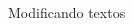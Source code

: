 \begin{frame}{Modificando textos}
\begin{columns}
\begin{column}{0.5\textwidth}

\end{column}
\end{columns}
\end{frame}
